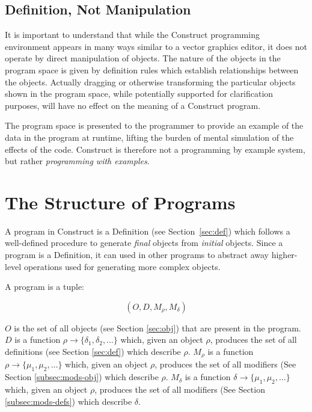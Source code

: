 \documentclass[twoside,openright,11pt]{report}
\begin{document}
\section{Definition, Not Manipulation}
\label{sec:not-manip}

It is important to understand that while the Construct programming environment appears in many ways similar to a vector graphics editor, it does not operate by direct manipulation of objects.
The nature of the objects in the program space is given by definition rules which establish relationships between the objects. 
Actually dragging or otherwise transforming the particular objects shown in the program space, while potentially supported for clarification purposes, will have no effect on the meaning of a Construct program.

The program space is presented to the programmer to provide an example of the data in the program at runtime, lifting the burden of mental simulation of the effects of the code. 
Construct is therefore not a programming by example\cite{smith1975pygmalion} system, but rather {\it programming with examples}\cite{myers1986taxonomy}.


\chapter{The Structure of Programs}
\label{chap:struct}

A program in Construct is a Definition (see Section~\ref{sec:def}) which follows a well-defined procedure to generate {\it final} objects from {\it initial} objects. 
Since a program is a Definition, it can used in other programs to abstract away higher-level operations used for generating more complex objects.

A program is a tuple:

$$(O, D, M_\rho, M_\delta)$$

$O$ is the set of all objects (see Section \ref{sec:obj}) that are present in the program. 
$D$ is a function $\rho \to \{\delta_1, \delta_2, \dots\}$ which, given an object $\rho$, produces the set of all definitions (see Section \ref{sec:def}) which describe $\rho$.
$M_\rho$ is a function $\rho \to \{\mu_1, \mu_2, \dots\}$ which, given an object $\rho$, produces the set of all modifiers (See Section \ref{subsec:mods-obj}) which describe $\rho$.
$M_\delta$ is a function $\delta \to \{\mu_1, \mu_2, \dots\}$ which, given an object $\rho$, produces the set of all modifiers (See Section \ref{subsec:mods-defs}) which describe $\delta$.
\end{document}
